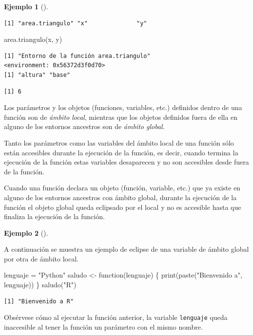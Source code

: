 \documentclass[
  a4paper,
]{scrreport}
\newenvironment{Shaded}{\begin{snugshade}}{\end{snugshade}}
\newcommand{\ControlFlowTok}[1]{\textcolor[rgb]{0.00,0.23,0.31}{#1}}
\newcommand{\FunctionTok}[1]{\textcolor[rgb]{0.28,0.35,0.67}{#1}}
\newcommand{\NormalTok}[1]{\textcolor[rgb]{0.00,0.23,0.31}{#1}}
\newcommand{\OtherTok}[1]{\textcolor[rgb]{0.00,0.23,0.31}{#1}}
\newcommand{\StringTok}[1]{\textcolor[rgb]{0.13,0.47,0.30}{#1}}
\theoremstyle{definition}
\theoremstyle{definition}
\newtheorem{example}{Ejemplo}[chapter]
\theoremstyle{remark}
\begin{document}
\begin{example}[]
\begin{verbatim}
[1] "area.triangulo" "x"              "y"             
\end{verbatim}

\begin{Shaded}
\begin{Highlighting}[]
\FunctionTok{area.triangulo}\NormalTok{(x, y)}
\end{Highlighting}
\end{Shaded}

\begin{verbatim}
[1] "Entorno de la función area.triangulo"
<environment: 0x56372d3f0d70>
[1] "altura" "base"  
\end{verbatim}

\begin{verbatim}
[1] 6
\end{verbatim}

\end{example}

Los parámetros y los objetos (funciones, variables, etc.) definidos
dentro de una función son de \emph{ámbito local}, mientras que los
objetos definidos fuera de ella en alguno de los entornos ancestros son
de \emph{ámbito global}.

Tanto los parámetros como las variables del ámbito local de una función
sólo están accesibles durante la ejecución de la función, es decir,
cuando termina la ejecución de la función estas variables desaparecen y
no son accesibles desde fuera de la función.

Cuando una función declara un objeto (función, variable, etc.) que ya
existe en alguno de los entornos ancestros con ámbito global, durante la
ejecución de la función el objeto global queda eclipsado por el local y
no es accesible hasta que finaliza la ejecución de la función.

\leavevmode{}%
\begin{example}[]\label{exm-eclise-variables-globales-por-locales}

A continuación se muestra un ejemplo de eclipse de una variable de
ámbito global por otra de ámbito local.

\begin{Shaded}
\begin{Highlighting}[]
\NormalTok{lenguaje }\OtherTok{=} \StringTok{"Python"}
\NormalTok{saludo }\OtherTok{\textless{}{-}} \ControlFlowTok{function}\NormalTok{(lenguaje) \{}
  \FunctionTok{print}\NormalTok{(}\FunctionTok{paste}\NormalTok{(}\StringTok{"Bienvenido a"}\NormalTok{, lenguaje))  }
\NormalTok{\}}
\FunctionTok{saludo}\NormalTok{(}\StringTok{"R"}\NormalTok{)}
\end{Highlighting}
\end{Shaded}

\begin{verbatim}
[1] "Bienvenido a R"
\end{verbatim}

Obsérvese cómo al ejecutar la función anterior, la variable
\texttt{lenguaje} queda inaccesible al tener la función un parámetro con
el mismo nombre.

\end{example}
\end{document}
